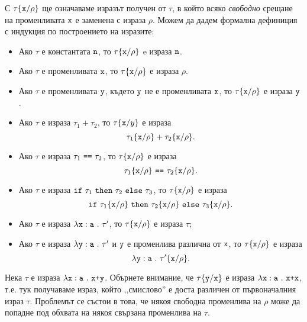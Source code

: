 С $\tau\{\texttt{x}/{\rho}\}$ ще означаваме изразът получен от $\tau$, в който всяко \emph{свободно} срещане на променливата $\texttt{x}$
е заменена с израза $\rho$. Можем да дадем формална дефиниция с индукция по построението на изразите:
\begin{itemize}
\item
  Ако $\tau$ е константата $\texttt{n}$, то $\tau\{\texttt{x}/{\rho}\}$ e израза $\texttt{n}$.
\item
  Ако $\tau$ е променливата $\texttt{x}$, то $\tau\{\texttt{x}/{\rho}\}$ е израза $\rho$.
\item
  Ако $\tau$ е променливата $\texttt{y}$, където $\texttt{y}$ не е променливата $\texttt{x}$, то $\tau\{\texttt{x}/{\rho}\}$ е израза $\texttt{y}$.
\item
  Ако $\tau$ е израза $\tau_1 + \tau_2$, то $\tau\{\texttt{x}/{y}\}$ е израза
  \[\tau_1\{\texttt{x}/{\rho}\} + \tau_2\{\texttt{x}/{\rho}\}.\]
\item
  Ако $\tau$ е израза $\tau_1\ \texttt{==}\ \tau_2$, то $\tau\{\texttt{x}/{\rho}\}$ е израза
  \[\tau_1\rename{x}{\rho}\ \vv{==}\ \tau_2\rename{x}{\rho}.\]
\item
  Ако $\tau$ е израза $\texttt{if}\ \tau_1\ \texttt{then}\ \tau_2\ \texttt{else}\ \tau_3$, то $\tau\{\texttt{x}/{\rho}\}$ е израза
  \[\texttt{if}\ \tau_1\{\texttt{x}/{\rho}\}\ \texttt{then}\ \tau_2\{\texttt{x}/{\rho}\}\ \texttt{else}\ \tau_3\{\texttt{x}/{\rho}\}.\]
\item
  Ако $\tau$ е израза $\lambda\texttt{x}:\texttt{a}\ .\ {\tau'}$, то
  $\tau\{\texttt{x}/{\rho}\}$ е израза $\tau$;
\item
  Ако $\tau$ е израза $\lambda\texttt{y}:\texttt{a}\ .\ {\tau'}$ и $\texttt{y}$ е променлива различна от $\texttt{x}$, то
  $\tau\{\texttt{x}/{\rho}\}$ е израза
  \[\lambda\texttt{y}:\texttt{a}\ .\ {\tau'\{\texttt{x}/{\rho}\}}.\]
\end{itemize}

Нека $\tau$ е израза $\lambda\texttt{x}:\texttt{a}\ .\ {\texttt{x+y}}$.
Обърнете внимание, че $\tau\{\texttt{y}/{\texttt{x}}\}$ е израза $\lambda\texttt{x}:\texttt{a}\ .\ {\texttt{x+x}}$,
т.е. тук получаваме израз, който ,,смислово'' е доста различен от първоначалния израз $\tau$.
Проблемът се състои в това, че някоя свободна променлива на $\rho$ може да попадне под обхвата на някоя свързана
променлива на $\tau$.


